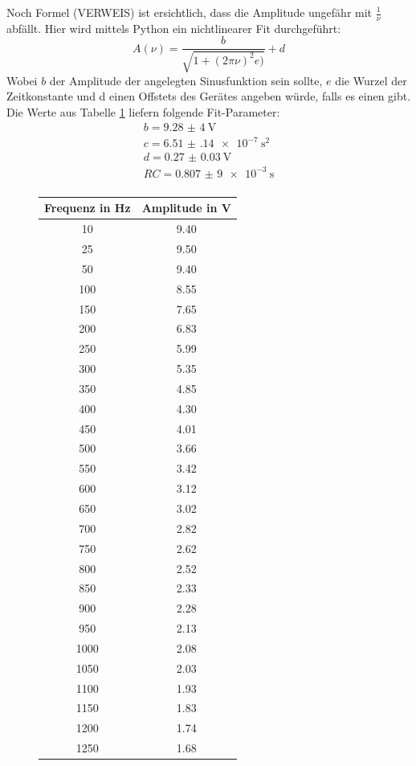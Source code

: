 Noch Formel (VERWEIS) ist ersichtlich, dass die Amplitude ungefähr mit $\frac{1}{\nu}$ abfällt. Hier wird mittels Python ein nichtlinearer Fit durchgeführt:
\begin{equation}
A(\nu) = \frac{b}{\sqrt{1+(2\pi \nu)^2 e)}} + d
\end{equation}
Wobei $b$ der Amplitude der angelegten Sinusfunktion sein sollte, $e$ die Wurzel der Zeitkonstante und d einen Offstets des Gerätes angeben würde, falls es einen gibt.
Die Werte aus Tabelle \ref{tab:amplitude} liefern folgende Fit-Parameter:
\begin{align}
	b =  \SI{9,28(4)}{\volt}\\
	c =  \SI{6.51(14)e-7}{\second\squared} \\
	d =  \SI{0.27(3)}{\volt} \\
	RC = \SI{0,807(9)e-3}{\second}\\
\end{align}

\begin{figure}[h!]
	\centering
	\begin{tabular}{c|c}
		Frequenz in \si{\hertz}& Amplitude in \si{\volt} \\
		\hline
	10 & 9.40  \\
	25 & 9.50  \\
	50 & 9.40  \\
	100 & 8.55 \\
	150 & 7.65 \\
	200 & 6.83 \\
	250 & 5.99 \\
	300 & 5.35 \\
	350 & 4.85 \\
	400 & 4.30  \\
	450 & 4.01 \\
	500 & 3.66 \\
	550 & 3.42 \\
	600 & 3.12 \\
	650 & 3.02 \\
	700 & 2.82 \\
	750 & 2.62 \\
	800 & 2.52 \\
	850 & 2.33 \\
	900 & 2.28 \\
	950 & 2.13 \\
	1000 & 2.08 \\
	1050 & 2.03 \\
	1100 & 1.93 \\
	1150 & 1.83 \\
	1200 & 1.74 \\
	1250 & 1.68 \\
	\end{tabular}
	\label{tab:amplitude}
\end{figure}



